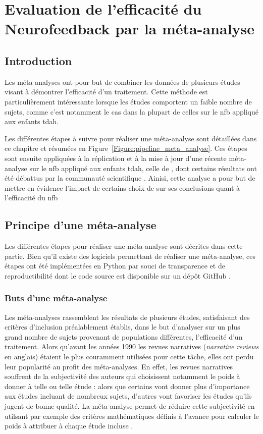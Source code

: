 \chapter{Evaluation de l'efficacité du Neurofeedback par la méta-analyse}

\section*{Introduction}
Les méta-analyses ont pour but de combiner les données de plusieurs études visant à démontrer l'efficacité d'un traitement. Cette méthode est
particulièrement intéressante lorsque les études comportent un faible nombre de sujets, comme c'est notamment le cas dans la plupart de celles sur 
le \gls{nfb} appliqué aux enfants \gls{tdah}.

Les différentes étapes à suivre pour réaliser une méta-analyse sont détaillées dans ce chapitre et résumées en Figure~\ref{Figure:pipeline_meta_analyse}.
Ces étapes sont ensuite appliquées à la réplication et à la mise à jour d'une récente méta-analyse sur le \gls{nfb} appliqué aux enfants \gls{tdah}, 
celle de \citet{Cortese2016}, dont certains résultats ont été débattus par la communauté scientifique \citep{Micoulaud2016}. Ainisi, cette analyse a pour but
de mettre en évidence l'impact de certains choix de \citet{Cortese2016} sur ses conclusions quant à l'efficacité du \gls{nfb}
\clearpage

\section{Principe d'une méta-analyse} \label{methods}

Les différentes étapes pour réaliser une méta-analyse sont décrites dans cette partie. Bien qu'il existe des logiciels permettant de réaliser une
méta-analyse, ces étapes ont été implémentées en Python par souci de transparence et de reproductibilité dont le code source est disponible sur un dépôt GitHub \citep{Bussalb2019c}.

\subsection{Buts d'une méta-analyse}

Les méta-analyses rassemblent les résultats de plusieurs études, satisfaisant des critères d'inclusion préalablement établis, dans le but d'analyser
sur un plus grand nombre de sujets provenant de populations différentes, l'efficacité d'un traitement. Alors qu'avant les années 1990 les revues narratives
(\textit{narrative reviews} en anglais) étaient le plus couramment utilisées pour cette tâche, elles ont perdu leur popularité au profit des méta-analyses.
En effet, les revues narratives souffrent de la subjectivité des auteurs qui choisissent notamment le poids à donner à telle ou telle étude : alors que certains
vont donner plus d'importance aux études incluant de nombreux sujets, d'autres vont favoriser les études qu'ils jugent de bonne qualité. La méta-analyse permet 
de réduire cette subjectivité en utilsant par exemple des critères mathématiques définis à l'avance pour calculer le poids à attribuer à chaque étude incluse
\citep{Borenstein2009}.

